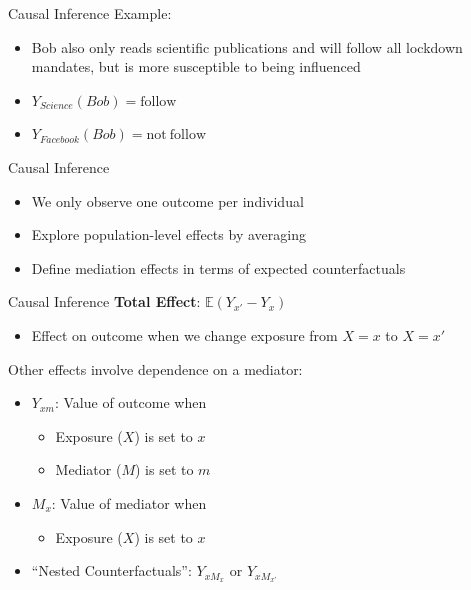 \documentclass[14pt]{beamer}
\begin{document}
\begin{frame}{Causal Inference}
    Example:
    \begin{itemize}
        \item Bob also only reads scientific publications and will follow all lockdown mandates, but is more susceptible to being influenced \newline
        \item $Y_{Science}(Bob) = \mathrm{follow}$
        \item $Y_{Facebook}(Bob) = \mathrm{not\ follow}$
    \end{itemize}
\end{frame}

\begin{frame}{Causal Inference}
    \begin{itemize}
        \item We only observe one outcome per individual\newline

        \item Explore population-level effects by averaging\newline

        \item Define mediation effects in terms of expected counterfactuals
    \end{itemize}
\end{frame}

\begin{frame}{Causal Inference}
    \textbf{Total Effect}: $\mathbb{E}(Y_{x'} - Y_{x})$
    \begin{itemize}
        \item Effect on outcome when we change exposure from $X=x$ to $X=x'$ \newline
    \end{itemize}

    Other effects involve dependence on a mediator:
    \begin{itemize}
        \item $Y_{xm}$: Value of outcome when
        \begin{itemize}
            \item Exposure ($X$) is set to $x$
            \item Mediator ($M$) is set to $m$
        \end{itemize}
        \item $M_x$: Value of mediator when
        \begin{itemize}
            \item Exposure ($X$) is set to $x$
        \end{itemize}
        \item ``Nested Counterfactuals'': $Y_{x M_x}$ or $Y_{x M_{x'}}$
    \end{itemize}

\end{frame}
\end{document}

